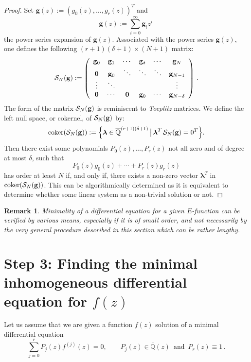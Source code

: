 \documentclass[reqno,english,12pt,a4paper]{smfart}
\newtheorem{rem}{Remark}
\numberwithin{equation}{section}
\def\Qbar{\overline{\mathbb Q}}
\def\g{{\bf g}}
\newcommand{\lambd}{{\boldsymbol{\lambda}}}
\begin{document}
\begin{proof}
Set $\mathbf{g}(z):=(g_0(z), \ldots, g_r(z))^{T}$ and 
$$
\mathbf{g}(z):=\sum_{i=0}^\infty \mathbf{g}_i z^i \,
$$
the power series expansion of $\mathbf{g}(z)$. 
Associated with the power series $\mathbf{g}(z)$, one defines the following 
$(r+1)(\delta+1)\times (N+1)$ matrix: 
\begin{equation*}
{\mathcal S_N}({\bf g}) := \left(\begin{array}{cccccc} \g_0 & \g_1 & \cdots & \g_{\delta} 
& \cdots & \g_N \\ {\mathbf 0} & \g_0 & \ddots & \ddots & \ddots & \g_{N-1} \\ 
\vdots & \ddots & &&& \vdots \\ {\mathbf 0} & \cdots &  {\mathbf 0} & \g_0 & \cdots & \g_{N-\delta} \end{array}\right) \, .
\end{equation*} 
The form of the matrix  ${\mathcal S}_N(\g)$ is reminiscent to {\it Toeplitz} matrices. 
We define the left null space, or cokernel, of 
${\mathcal S}_N(\g)$ by:
$$
{\rm coker }({\mathcal S}_N(\g)) := 
\Big\{  \lambd \in \Qbar^{(r+1)(\delta+1)} \,\big\vert \, \lambd^T \, {\mathcal S}_N(\g) = 0^T\Big\}.
$$
Then there exist some polynomials 
$P_0(z),\ldots,P_r(z)$ not all zero and of degree at most $\delta$, such that 
$$
P_0(z)g_0(z) +\cdots + P_r(z)g_r(z)
$$
has order at least $N$ if, and only if, there exists a non-zero vector 
$\lambd^T$ in ${\rm coker} ({\mathcal S}_N(\g))$. This can be algorithmically determined as it is equivalent to determine whether some linear system as a non-trivial solution or not. 
\end{proof}

\begin{rem}\emph{ Minimality of a differential equation for a given $E$-function 
can be verified by various means, especially if it is of small order, and not necessarily by the very general procedure described in this section which can be rather lengthy.}
\end{rem}


\section{Step 3: Finding the minimal inhomogeneous differential equation for $f(z)$}\label{sec:s3}



Let us assume that we are given a function $f(z)$ solution of a minimal differential equation 
\begin{equation}\label{eq:1}
\sum_{j=0}^r P_j(z)f^{(j)}(z)=0, \qquad P_j(z)\in \Qbar(z) \,\mbox{ and }\, P_r(z)\equiv 1\, .
\end{equation}
\end{document}
